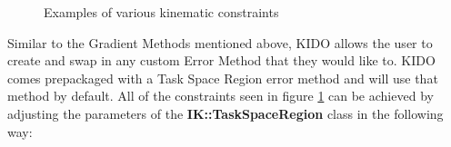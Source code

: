 \begin{figure}
  \centering
  \caption{Examples of various kinematic constraints}
  \label{fig:ik}
\end{figure}

Similar to the Gradient Methods mentioned above, KIDO allows the user to create and swap in any custom Error Method that they would like to. KIDO comes prepackaged with a Task Space Region\cite{Berenson_2011_6867} error method and will use that method by default. All of the constraints seen in figure \ref{fig:ik} can be achieved by adjusting the parameters of the \textbf{IK::TaskSpaceRegion} class in the following way:

